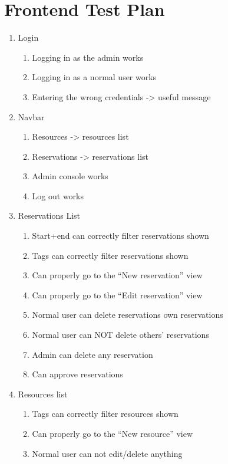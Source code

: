 \documentclass[12pt]{article}
\begin{document}
\clearpage
\section{Frontend Test Plan}
\label{appendix:frontendtest}
\begin{enumerate}
    \item Login
    \begin{enumerate}
        \item Logging in as the admin works
        \item Logging in as a normal user works
        \item Entering the wrong credentials -> useful message
    \end{enumerate}
    \item Navbar
    \begin{enumerate}
        \item Resources -> resources list
        \item Reservations -> reservations list
        \item Admin console works
        \item Log out works
    \end{enumerate}
    \item Reservations List
    \begin{enumerate}
        \item Start+end can correctly filter reservations shown
        \item Tags can correctly filter reservations shown
        \item Can properly go to the ``New reservation'' view
        \item Can properly go to the ``Edit reservation'' view
        \item Normal user can delete reservations own reservations
        \item Normal user can NOT delete others' reservations
        \item Admin can delete any reservation
        \item Can approve reservations
    \end{enumerate}
    \item Resources list
    \begin{enumerate}
        \item Tags can correctly filter resources shown
        \item Can properly go to the ``New resource'' view
        \item Normal user can not edit/delete anything

\end{enumerate}
\end{enumerate}
\end{document}
